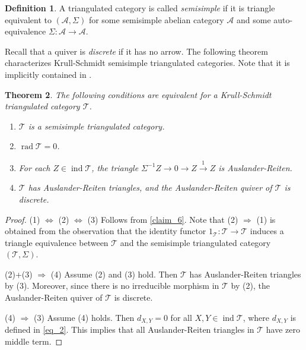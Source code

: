 \documentclass[12pt]{amsart}
\numberwithin{equation}{subsection}
\theoremstyle{plain}
\newtheorem{theorem}{Theorem}[section]
\theoremstyle{definition}
\newtheorem{definition}[theorem]{Definition}
\newcommand{\rad}{\operatorname{rad}}
\newcommand{\ind}{\operatorname{ind}}
\newcommand{\T}{\mathcal{T}}
\newcommand{\A}{\mathcal{A}}
\begin{document}
\begin{definition}
A triangulated category is called {\it semisimple} if it is triangle equivalent to $(\mathcal{A}, \Sigma)$ for some semisimple abelian category $\mathcal{A}$ and some auto-equivalence $\Sigma:\mathcal{A}\to \A$.
\end{definition}



Recall that a quiver is {\it discrete} if it has no arrow.
The following theorem characterizes Krull-Schmidt semisimple triangulated categories.
Note that it is implicitly contained in \cite[Proposition 6.2]{ShipingLiu_2010}.




\begin{theorem}\label{claim_5}
The following conditions are equivalent for a Krull-Schmidt triangulated category $\T$.
\begin{enumerate}
\item $\T$ is a semisimple triangulated category.
\item $\rad\T=0$.
\item For each $Z \in \ind\T$, the  triangle $\Sigma^{-1}Z \to 0 \to Z \xrightarrow{1} Z$ is Auslander-Reiten.
\item $\T$ has Auslander-Reiten triangles, and the Auslander-Reiten quiver of $\T$ is discrete.   
\end{enumerate}
\end{theorem}
\begin{proof} 


(1) $\Leftrightarrow$ (2) $\Leftrightarrow$ (3)
Follows from \cref{claim_6}.
Note that (2) $\Rightarrow$ (1) is obtained from the observation that  the identity functor $1_\T: \T \to \T$ induces a triangle equivalence between $\T$ and the semisimple triangulated category $(\T, \Sigma)$.










(2)+(3) $\Rightarrow$ (4)
Assume (2) and (3) hold.
Then $\T$ has Auslander-Reiten triangles by (3).
Moreover, since there is no irreducible morphism in $\T$ by (2), the Auslander-Reiten quiver of $\T$ is discrete.







(4) $\Rightarrow$ (3)
Assume (4) holds.
Then $d_{X,Y} = 0$ for all $X, Y \in\ind\T$, where $d_{X,Y}$ is defined in \eqref{eq_2}.
This implies that all Auslander-Reiten triangles in $\T$ have zero middle term.
\end{proof}
\end{document}

